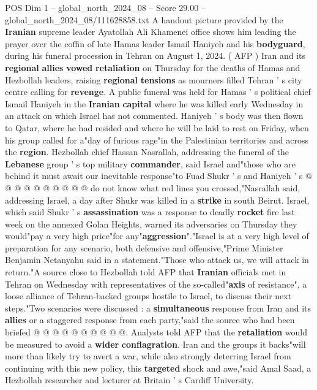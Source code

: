 \begin{textsample}{POS Dim 1 – global\_north\_2024\_08 – Score 29.00 – global\_north\_2024\_08/111628858.txt}  \label{ex:f1_pos_076}
A handout picture provided by the \textbf{Iranian} supreme leader Ayatollah Ali Khamenei office shows him leading the prayer over the coffin of late Hamas leader Ismail Haniyeh and his \textbf{bodyguard}, during his funeral procession in Tehran on August 1, 2024. ( AFP ) Iran and its \textbf{regional} \textbf{allies} \textbf{vowed} \textbf{retaliation} on Thursday for the deaths of Hamas and Hezbollah leaders, raising \textbf{regional} \textbf{tensions} as mourners filled Tehran ' s city centre calling for \textbf{revenge}.
A public funeral was held for Hamas ' s political chief Ismail Haniyeh in the \textbf{Iranian} \textbf{capital} where he was killed early Wednesday in an attack on which Israel has not commented.
Haniyeh ' s body was then flown to Qatar, where he had resided and where he will be laid to rest on Friday, when his group called for a"day of furious rage"in the Palestinian territories and across the \textbf{region}.
Hezbollah chief Hassan Nasrallah, addressing the funeral of the \textbf{Lebanese} group ' s top military \textbf{commander}, said Israel and"those who are behind it must await our inevitable response"to Fuad Shukr ' s and Haniyeh ' s @ @ @ @ @ @ @ @ @ @ do not know what red lines you crossed,"Nasrallah said, addressing Israel, a day after Shukr was killed in a \textbf{strike} in south Beirut.
Israel, which said Shukr ' s \textbf{assassination} was a response to deadly \textbf{rocket} fire last week on the annexed Golan Heights, warned its adversaries on Thursday they would"pay a very high price"for any"\textbf{aggression}"."Israel is at a very high level of preparation for any scenario, both defensive and offensive,"Prime Minister Benjamin Netanyahu said in a statement."Those who attack us, we will attack in return."A source close to Hezbollah told AFP that \textbf{Iranian} officials met in Tehran on Wednesday with representatives of the so-called"\textbf{axis} of resistance", a loose alliance of Tehran-backed groups hostile to Israel, to discuss their next steps."Two scenarios were discussed : a \textbf{simultaneous} response from Iran and its \textbf{allies} or a staggered response from each party,"said the source who had been briefed @ @ @ @ @ @ @ @ @ @.
Analysts told AFP that the \textbf{retaliation} would be measured to avoid a \textbf{wider} \textbf{conflagration}.
Iran and the groups it backs"will more than likely try to avert a war, while also strongly deterring Israel from continuing with this new policy, this \textbf{targeted} shock and awe,"said Amal Saad, a Hezbollah researcher and lecturer at Britain ' s Cardiff University.

\end{textsample}
